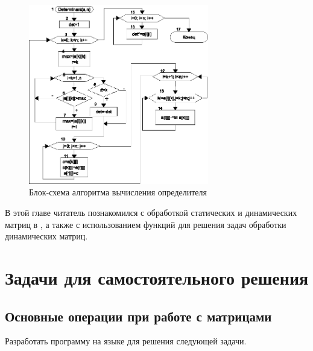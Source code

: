 \begin{figure}[htb]
\begin{center}
\includegraphics[width=0.7\textwidth]{img/ris_6_17}
\caption{Блок-схема алгоритма вычисления определителя}
\label{ch06:refDrawing16}
\end{center}
\end{figure}

В этой главе читатель познакомился с обработкой статических и динамических матриц в , а также с использованием
функций для решения задач обработки динамических матриц. 

\section[Задачи для самостоятельного решения]{Задачи для самостоятельного решения}
\subsection[Основные операции при работе с матрицами]{Основные операции при работе с матрицами}
Разработать программу на языке  для решения следующей задачи.

